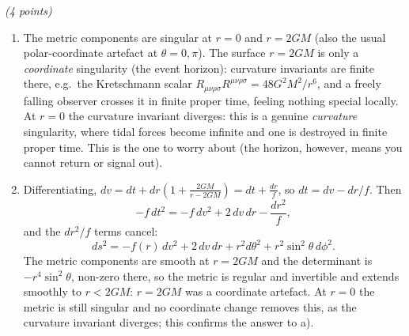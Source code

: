 \documentclass[12pt]{article}
\newcommand{\be}{\begin{equation}}
\newcommand{\ee}{\end{equation}}
\newcounter{quesno}
\newcommand{\ques}[1]{\vspace{2em}\stepcounter{quesno}
\noindent{\bf Question \thequesno.} \emph{(#1 points)}\\
}
\begin{document}
\ques{4}
\begin{enumerate}[label=\alph*)]
\item The metric components are singular at $r=0$ and $r=2GM$ (also the usual polar-coordinate artefact at $\theta=0,\pi$). The surface $r=2GM$ is only a \emph{coordinate} singularity (the event horizon): curvature invariants are finite there, e.g.\ the Kretschmann scalar $R_{\mu\nu\rho\sigma}R^{\mu\nu\rho\sigma}=48G^2M^2/r^6$, and a freely falling observer crosses it in finite proper time, feeling nothing special locally. At $r=0$ the curvature invariant diverges: this is a genuine \emph{curvature} singularity, where tidal forces become infinite and one is destroyed in finite proper time. This is the one to worry about (the horizon, however, means you cannot return or signal out).
\item Differentiating, $dv=dt+dr\left(1+\frac{2GM}{r-2GM}\right)=dt+\frac{dr}{f}$, so $dt=dv-dr/f$. Then
\be
-f\,dt^2=-f\,dv^2+2\,dv\,dr-\frac{dr^2}{f},
\ee
and the $dr^2/f$ terms cancel:
\be
ds^2=-f(r)\,dv^2+2\,dv\,dr+r^2d\theta^2+r^2\sin^2\theta\,d\phi^2 .
\ee
The metric components are smooth at $r=2GM$ and the determinant is $-r^4\sin^2\theta$, non-zero there, so the metric is regular and invertible and extends smoothly to $r<2GM$: $r=2GM$ was a coordinate artefact. At $r=0$ the metric is still singular and no coordinate change removes this, as the curvature invariant diverges; this confirms the answer to a).
\end{enumerate}
\end{document}
